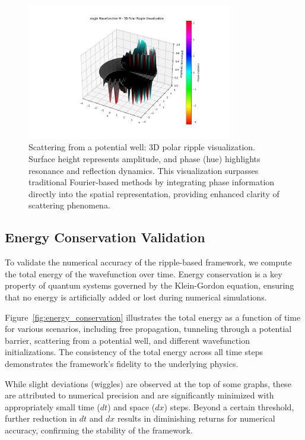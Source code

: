 \documentclass[12pt]{article}
\begin{document}
\begin{figure}[H]
\centering
\includegraphics[width=0.8\textwidth]{images/scattering_wavefunction_3d_polar_probability_density_with_phase.png}
\caption{Scattering from a potential well: 3D polar ripple visualization. Surface height represents amplitude, and phase (hue) highlights resonance and reflection dynamics. This visualization surpasses traditional Fourier-based methods by integrating phase information directly into the spatial representation, providing enhanced clarity of scattering phenomena.}
\label{fig:scattering_3d_polar}
\end{figure}

\subsection{Energy Conservation Validation}
\label{sec:validation_benchmarking}

To validate the numerical accuracy of the ripple-based framework, we compute the total energy of the wavefunction over time. Energy conservation is a key property of quantum systems governed by the Klein-Gordon equation, ensuring that no energy is artificially added or lost during numerical simulations.

Figure~\ref{fig:energy_conservation} illustrates the total energy as a function of time for various scenarios, including free propagation, tunneling through a potential barrier, scattering from a potential well, and different wavefunction initializations. The consistency of the total energy across all time steps demonstrates the framework’s fidelity to the underlying physics. 
    
While slight deviations (wiggles) are observed at the top of some graphs, these are attributed to numerical precision and are significantly minimized with appropriately small time (\(dt\)) and space (\(dx\)) steps. Beyond a certain threshold, further reduction in \(dt\) and \(dx\) results in diminishing returns for numerical accuracy, confirming the stability of the framework.
\end{document}
